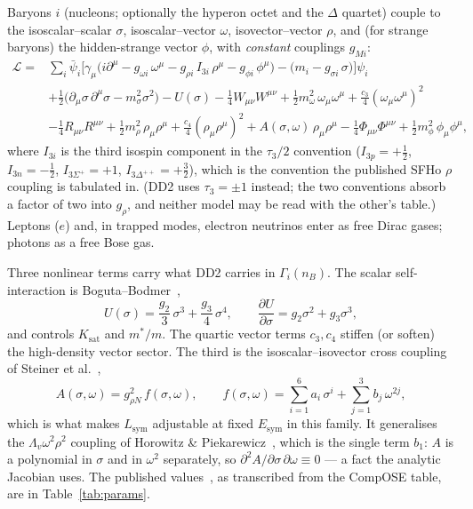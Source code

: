 \documentclass[aps,prc,onecolumn,superscriptaddress,nofootinbib,10pt]{revtex4-2}
\newcommand{\nB}{n_B}
\begin{document}
Baryons $i$ (nucleons; optionally the hyperon octet and the $\Delta$ quartet)
couple to the isoscalar--scalar $\sigma$, isoscalar--vector $\omega$,
isovector--vector $\rho$, and (for strange baryons) the hidden-strange vector
$\phi$, with \emph{constant} couplings $g_{Mi}$:
%
\begin{align}
\mathcal{L} ={}& \sum_i \bar\psi_i \Big[ \gamma_\mu \big( i\partial^\mu
      - g_{\omega i}\,\omega^\mu
      - g_{\rho i}\, I_{3i}\, \rho^\mu
      - g_{\phi i}\, \phi^\mu \big)
      - \big( m_i - g_{\sigma i}\,\sigma \big) \Big] \psi_i
      \nonumber\\
 &+ \tfrac12 \big( \partial_\mu \sigma\, \partial^\mu \sigma
      - m_\sigma^2 \sigma^2 \big) - U(\sigma)
   - \tfrac14 W_{\mu\nu} W^{\mu\nu} + \tfrac12 m_\omega^2\, \omega_\mu \omega^\mu
   + \tfrac{c_3}{4} (\omega_\mu \omega^\mu)^2
      \nonumber\\
 &- \tfrac14 R_{\mu\nu} R^{\mu\nu} + \tfrac12 m_\rho^2\, \rho_\mu \rho^\mu
   + \tfrac{c_4}{4} (\rho_\mu \rho^\mu)^2
   + A(\sigma, \omega)\, \rho_\mu \rho^\mu
   - \tfrac14 \Phi_{\mu\nu} \Phi^{\mu\nu} + \tfrac12 m_\phi^2\, \phi_\mu \phi^\mu ,
\label{eq:lagrangian}
\end{align}
%
where $I_{3i}$ is the third isospin component in the $\tau_3/2$ convention
($I_{3p} = +\tfrac12$, $I_{3n} = -\tfrac12$, $I_{3\Sigma^+} = +1$,
$I_{3\Delta^{++}} = +\tfrac32$), which is the convention the published SFHo
$\rho$ coupling is tabulated in. (DD2 uses $\tau_3 = \pm 1$ instead; the two
conventions absorb a factor of two into $g_\rho$, and neither model may be
read with the other's table.) Leptons ($e$) and, in trapped modes, electron
neutrinos enter as free Dirac gases; photons as a free Bose gas.

Three nonlinear terms carry what DD2 carries in $\Gamma_i(\nB)$. The scalar
self-interaction is Boguta--Bodmer~\cite{BogutaBodmer1977},
%
\begin{equation}
U(\sigma) = \frac{g_2}{3}\, \sigma^3 + \frac{g_3}{4}\, \sigma^4 ,
\qquad
\frac{\partial U}{\partial \sigma} = g_2 \sigma^2 + g_3 \sigma^3 ,
\label{eq:Usigma}
\end{equation}
%
and controls $K_{\mathrm{sat}}$ and $m^*/m$. The quartic vector terms $c_3,
c_4$ stiffen (or soften) the high-density vector sector. The third is the
isoscalar--isovector cross coupling of Steiner et al.~\cite{Steiner2005},
%
\begin{equation}
A(\sigma, \omega) = g_{\rho N}^2\, f(\sigma, \omega),
\qquad
f(\sigma, \omega) = \sum_{i=1}^{6} a_i\, \sigma^i
                  + \sum_{j=1}^{3} b_j\, \omega^{2j} ,
\label{eq:Afunction}
\end{equation}
%
which is what makes $L_{\mathrm{sym}}$ adjustable at fixed $E_{\mathrm{sym}}$
in this family. It generalises the $\Lambda_v \omega^2 \rho^2$ coupling of
Horowitz \& Piekarewicz~\cite{HorowitzPiekarewicz2001}, which is the single
term $b_1$: $A$ is a polynomial in $\sigma$ and in $\omega^2$ separately, so
$\partial^2 A/\partial\sigma\,\partial\omega \equiv 0$ --- a fact the analytic
Jacobian uses. The published values~\cite{Steiner2013}, as transcribed from
the CompOSE table, are in Table~\ref{tab:params}.
\end{document}
